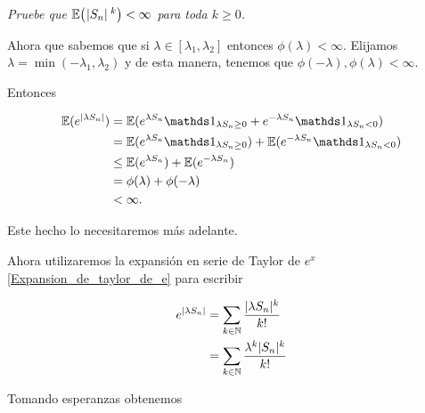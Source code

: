 \emph{
	Pruebe que $\mathbb{E}\! \left( \hspace{.25mm}\left|S_n\right|\hspace{.25mm}^k \right)<\infty$ para toda $k\geq 0$.
}

\afterstatement\par\null

Ahora que sabemos que si $\lambda \in [\lambda_1, \lambda_2]$ entonces $\phi(\lambda) < \infty$. Elijamos 
$\lambda = \min(-\lambda_1, \lambda_2)$ y de esta manera, tenemos que $\phi(-\lambda), \phi(\lambda) < \infty$.\par\null

Entonces

\begin{align}
    \E(e^{|\lambda S_n|})   &=      \E(e^{\lambda S_n} \indic_{\lambda S_n \geq 0} + e^{-\lambda S_n} \indic_{\lambda S_n < 0} )        \\ 
                            &=      \E(e^{\lambda S_n} \indic_{\lambda S_n \geq 0}) + \E(e^{-\lambda S_n} \indic_{\lambda S_n < 0})     \\
                            &\leq   \E(e^{\lambda S_n} ) + \E(e^{-\lambda S_n})                                                         \\
                            &=      \phi(\lambda) + \phi(-\lambda)                                                                      \\
                            &<      \infty.                                                  
\end{align}\par\null

Este hecho lo necesitaremos más adelante.\par\null

Ahora utilizaremos la expansión en serie de Taylor de $e^x$ \eqref{Expansion_de_taylor_de_e} para escribir

\begin{align}
    e^{|\lambda S_n|}   &=  \sum_{k \in \mathbb{N}} \frac{|\lambda S_n|^k}{k!}      \\
                        &=  \sum_{k \in \mathbb{N}} \frac{\lambda^k |S_n|^k}{k!}    
\end{align}\par\null

Tomando esperanzas obtenemos

